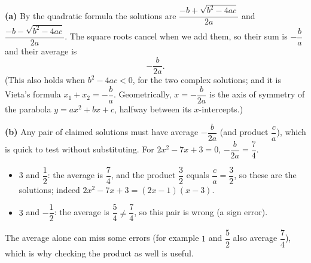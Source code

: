 \textbf{(a)} By the quadratic formula the solutions are $\dfrac{-b+\sqrt{b^2-4ac}}{2a}$ and $\dfrac{-b-\sqrt{b^2-4ac}}{2a}$. The square roots cancel when we add them, so their sum is $-\dfrac {b}{a}$ and their average is
\[\boxed{-\dfrac{b}{2a}}.\]
(This also holds when $b^2-4ac<0$, for the two complex solutions; and it is Vieta's formula $x_1+x_2=-\dfrac {b}{a}$. Geometrically, $x=-\dfrac {b}{2a}$ is the axis of symmetry of the parabola $y=ax^2+bx+c$, halfway between its $x$-intercepts.)

\textbf{(b)} Any pair of claimed solutions must have average $-\dfrac {b}{2a}$ (and product $\dfrac {c}{a}$), which is quick to test without substituting. For $2x^2-7x+3=0$, $-\dfrac {b}{2a}=\dfrac{7}{4}$.
\begin{itemize}
\item $3$ and $\dfrac{1}{2}$: the average is $\dfrac{7}{4}$, and the product $\dfrac{3}{2}$ equals $\dfrac {c}{a}=\dfrac{3}{2}$, so these are the solutions; indeed $2x^2-7x+3=(2x-1)(x-3)$.
\item $3$ and $-\dfrac{1}{2}$: the average is $\dfrac{5}{4}\ne\dfrac{7}{4}$, so this pair is wrong (a sign error).
\end{itemize}
The average alone can miss some errors (for example $1$ and $\dfrac{5}{2}$ also average $\dfrac{7}{4}$), which is why checking the product as well is useful.
